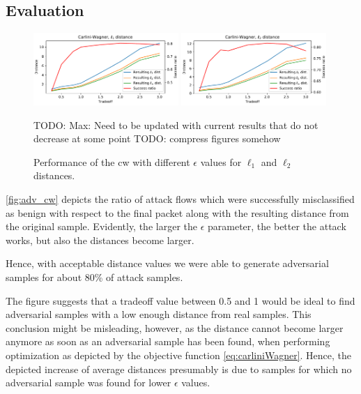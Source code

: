 \documentclass[conference]{IEEEtran}
\newcommand\note[2]{{\color{#1}#2}}
\newcommand\todo[1]{{\note{red}{TODO: #1}}}
\begin{document}
\subsection{Evaluation}
\begin{figure}
\includegraphics[width=0.49\textwidth]{adv_plots/cwl1.pdf}
\includegraphics[width=0.49\textwidth]{adv_plots/cwl2.pdf}
\caption{Performance of the \gls{cw} with different $\epsilon$ values for $\ell_1$ and $\ell_2$ distances.}
\todo{Max: Need to be updated with current results that do not decrease at some point}
\label{fig:adv_cw}
\todo{compress figures somehow}
\end{figure}
\autoref{fig:adv_cw} depicts the ratio of attack flows which were successfully misclassified as benign with respect to the final packet along with the resulting distance from the original sample. Evidently, the larger the $\epsilon$ parameter, the better the attack works, but also the distances become larger.

Hence, with acceptable distance values we were able to generate adversarial samples for about 80\% of attack samples.

The figure suggests that a tradeoff value between 0.5 and 1 would be ideal to find adversarial samples with a low enough distance from real samples. This conclusion might be misleading, however, as the distance cannot become larger anymore as soon as an adversarial sample has been found, when performing optimization as depicted by the objective function \eqref{eq:carliniWagner}. Hence, the depicted increase of average distances presumably is due to samples for which no adversarial sample was found for lower $\epsilon$ values.
\end{document}

